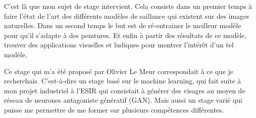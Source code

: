 \par
C'est là que mon sujet de stage intervient. Cela consiste dans un premier temps à faire l'état de l'art des différents modèles de saillance qui existent sur des images naturelles. Dans un second temps le but est de ré-entrainer le meilleur modèle pour qu'il s'adapte à des peintures. Et enfin à partir des résultats de ce modèle, trouver des applications visuelles et ludiques pour montrer l'intérêt d'un tel modèle.

\par 
Ce stage qui m'a été proposé par Olivier Le Meur correspondait à ce que je recherchais. C'est-à-dire un stage basé sur le machine learning, qui fait suite à mon projet industriel à l'ESIR qui consistait à générer des visages au moyen de réseau de neurones antagoniste génératif (GAN). Mais aussi un stage varié qui puisse me permettre de me former sur plusieurs compétences différentes.

